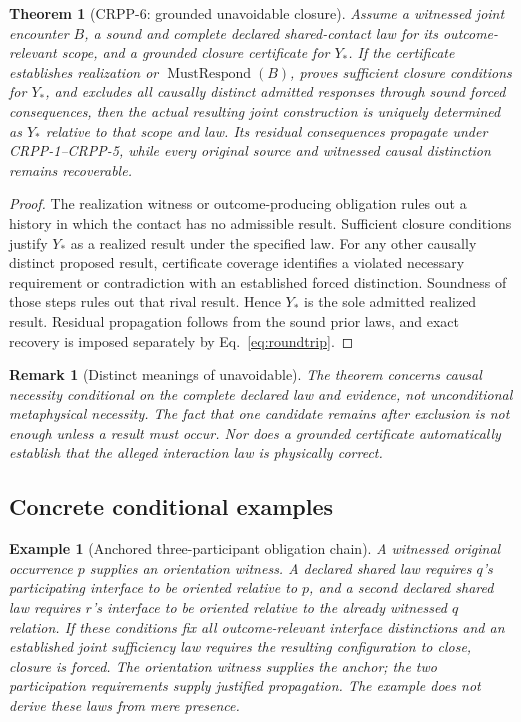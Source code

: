 \documentclass[11pt]{article}
\newtheorem{theorem}[definition]{Theorem}
\newtheorem{remark}[definition]{Remark}
\newtheorem{example}[definition]{Example}
\begin{document}
\begin{theorem}[CRPP-6: grounded unavoidable closure]
Assume a witnessed joint encounter $B$, a sound and complete
declared shared-contact law for its outcome-relevant scope,
and a grounded closure certificate for $Y_*$. If the
certificate establishes realization or
$\operatorname{MustRespond}(B)$, proves sufficient closure
conditions for $Y_*$, and excludes all causally distinct
admitted responses through sound forced consequences,
then the actual resulting joint construction is uniquely
determined as $Y_*$ relative to that scope and law.
Its residual consequences propagate under CRPP-1--CRPP-5,
while every original source and witnessed causal distinction
remains recoverable.
\end{theorem}
\begin{proof}
The realization witness or outcome-producing obligation
rules out a history in which the contact has no admissible
result. Sufficient closure conditions justify $Y_*$ as
a realized result under the specified law. For any other
causally distinct proposed result, certificate coverage
identifies a violated necessary requirement or contradiction
with an established forced distinction. Soundness of those
steps rules out that rival result. Hence $Y_*$ is the sole
admitted realized result. Residual propagation follows
from the sound prior laws, and exact recovery is imposed
separately by Eq.~\eqref{eq:roundtrip}.
\end{proof}

\begin{remark}[Distinct meanings of unavoidable]
The theorem concerns \emph{causal necessity conditional on
the complete declared law and evidence}, not unconditional
metaphysical necessity. The fact that one candidate remains
after exclusion is not enough unless a result must occur.
Nor does a grounded certificate automatically establish that
the alleged interaction law is physically correct.
\end{remark}

\subsection{Concrete conditional examples}
\begin{example}[Anchored three-participant obligation chain]
A witnessed original occurrence $p$ supplies an orientation
witness. A declared shared law requires $q$'s participating
interface to be oriented relative to $p$, and a second
declared shared law requires $r$'s interface to be oriented
relative to the already witnessed $q$ relation. If these
conditions fix all outcome-relevant interface distinctions
and an established joint sufficiency law requires the
resulting configuration to close, closure is forced.
The orientation witness supplies the anchor; the two
participation requirements supply justified propagation.
The example does not derive these laws from mere presence.
\end{example}
\end{document}
